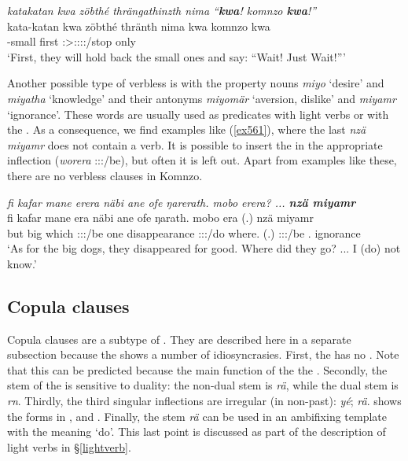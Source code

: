 \begin{exe}
 	\ex \emph{katakatan kwa zöbthé thrängathinzth nima ``\textbf{kwa}! komnzo \textbf{kwa}!''}\\
 	\gll kata-katan kwa zöbthé thränth nima kwa komnzo kwa\\
	\Redup-small \Fut{} first \Stpl:\Sbj>\Stpl:\Obj:\Irr:\Pfv:\Venit/stop \Quot{} \Fut{} only \Fut{}\\
 	\trans `First, they will hold back the small ones and say: ``Wait! Just Wait!'''\\
 	\label{ex560}
\end{exe}

Another possible type of verbless  is with the property nouns \emph{miyo} `desire' and \emph{miyatha} `knowledge' and their antonyms \emph{miyomär} `aversion, dislike' and \emph{miyamr} `ignorance'. These words are usually used as  predicates with light verbs or with the . As a consequence, we find examples like ({\ref{ex561}}), where the last  \emph{nzä miyamr} does not contain a verb. It is possible to insert the  in the appropriate inflection (\emph{worera} \Fsg:\Sbj:\Pst:\Ipfv/be), but often it is left out. Apart from examples like these, there are no verbless clauses in Komnzo.

\begin{exe}
	\ex \emph{fi kafar mane erera näbi ane ofe ŋarerath. mobo erera? ... \textbf{nzä miyamr}}\\
	\gll fi kafar mane era näbi ane ofe ŋarath. mobo era (.) nzä miyamr\\
	but big which \Stpl:\Sbj:\Pst:\Ipfv/be one \Dem{} disappearance \Stpl:\Sbj:\Pst:\Ipfv/do where.\All{} (.)  \Stpl:\Sbj:\Pst:\Ipfv/be \Fsg.\Abs{} ignorance\\
	\trans `As for the big dogs, they disappeared for good. Where did they go? ... I (do) not know.'
	\label{ex561}
\end{exe}

\subsection{Copula clauses}\label{copclause}

Copula clauses are a subtype of  . They are described here in a separate subsection because the  shows a number of idiosyncrasies. First, the  has no . Note that this can be predicted because the main function of the  the  . Secondly, the stem of the  is sensitive to duality: the non-dual stem is \emph{rä}, while the dual stem is \emph{rn}. Thirdly, the third  singular inflections are irregular (in non-past):  \emph{yé};  \emph{rä}.  shows the  forms in ,  and  . Finally, the  stem \emph{rä} can be used in an ambifixing template with the meaning `do'. This last point is discussed as part of the description of light verbs in \S\ref{lightverb}.

